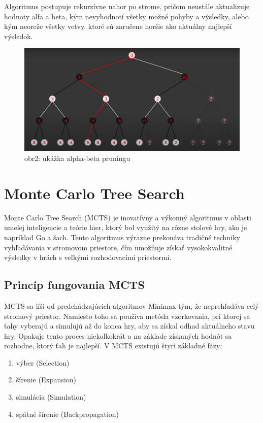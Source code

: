 \documentclass[10pt,twoside,slovak,a4paper]{article}
\begin{document}
Algoritmus postupuje rekurzívne nahor po strome, pričom neustále aktualizuje hodnoty alfa a beta, kým nevyhodnotí všetky možné pohyby a výsledky, alebo kým neoreže všetky vetvy, ktoré sú zaručene horšie ako aktuálny najlepší výsledok.
\begin{figure}[h]
    \centering
    \includegraphics[width=\textwidth]{alpha-beta}
    \caption{obr2: ukážka alpha-beta pruningu}
    \label{obr2}
\end{figure}


\section{Monte Carlo Tree Search} \label{MonteCarlo}
Monte Carlo Tree Search (MCTS) je inovatívny a výkonný algoritmus v oblasti umelej inteligencie a teórie hier, ktorý bol využitý na rôzne stolové hry, ako je napríklad Go a šach. Tento algoritmus výrazne prekonáva tradičné techniky vyhľadávania v stromovom priestore, čím umožňuje získať vysokokvalitné výsledky v hrách s veľkými rozhodovacími priestormi.

\subsection{Princíp fungovania MCTS} \label{PrincipMTCS}
MCTS sa líši od predchádzajúcich algoritmov Minimax tým, že neprehľadáva celý stromový priestor. Namiesto toho sa používa metóda vzorkovania, pri ktorej sa ťahy vyberajú a simulujú až do konca hry, aby sa získal odhad aktuálneho stavu hry. Opakuje tento proces niekoľkokrát a na základe získaných hodnôt sa rozhodne, ktorý ťah je najlepší. V MCTS existujú štyri základné fázy:
\begin{enumerate}
	\item výber (Selection)
	\item šírenie (Expansion)
	\item simulácia (Simulation)
	\item spätné šírenie (Backpropagation)
\end{enumerate}
\end{document}
